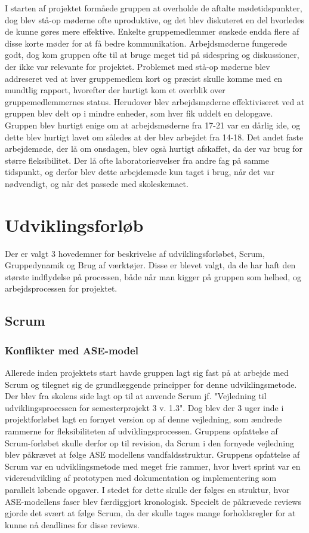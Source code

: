 I starten af projektet formåede gruppen at overholde de aftalte mødetidspunkter, dog blev stå-op møderne ofte uproduktive, og det blev diskuteret en del hvorledes de kunne gøres mere effektive. Enkelte gruppemedlemmer ønskede endda flere af disse korte møder for at få bedre kommunikation. Arbejdsmøderne fungerede godt, dog kom gruppen ofte til at bruge meget tid på sidespring og diskussioner, der ikke var relevante for projektet. Problemet med stå-op møderne blev addreseret ved at hver gruppemedlem kort og præcist skulle komme med en mundtlig rapport, hvorefter der hurtigt kom et overblik over gruppemedlemmernes status. Herudover blev arbejdsmøderne effektiviseret ved at gruppen blev delt op i mindre enheder, som hver fik uddelt en delopgave. Gruppen blev hurtigt enige om at arbejdsmøderne fra 17-21 var en dårlig ide, og dette blev hurtigt lavet om således at der blev arbejdet fra 14-18. Det andet faste arbejdemøde, der lå om onsdagen, blev også hurtigt afskaffet, da der var brug for større fleksibilitet. Der lå ofte laboratorieøvelser fra andre fag på samme tidspunkt, og derfor blev dette arbejdemøde kun taget i brug, når det var nødvendigt, og når det passede med skoleskemaet.    

\section{Udviklingsforløb}
Der er valgt 3 hovedemner for beskrivelse af udviklingsforløbet, Scrum, Gruppedynamik og Brug af værktøjer. Disse er blevet valgt, da de har haft den største indflydelse på processen, både når man kigger på gruppen som helhed, og arbejdsprocessen for projektet.  

\subsection{Scrum}
\subsubsection{Konflikter med ASE-model}
Allerede inden projektets start havde gruppen lagt sig fast på at arbejde med Scrum og tilegnet sig de grundlæggende principper for denne udviklingsmetode. Der blev fra skolens side lagt op til at anvende Scrum jf. "Vejledning til udviklingsprocessen for semesterprojekt 3 v. 1.3". Dog blev der 3 uger inde i projektforløbet lagt en fornyet version op af denne vejledning, som ændrede rammerne for fleksibiliteten af udviklingsprocessen. Gruppens opfattelse af Scrum-forløbet skulle derfor op til revision, da Scrum i den fornyede vejledning blev påkrævet at følge ASE modellens vandfaldsstruktur. Gruppens opfattelse af Scrum var en udviklingsmetode med meget frie rammer, hvor hvert sprint var en videreudvikling af prototypen med dokumentation og implementering som 
parallelt løbende opgaver. I stedet for dette skulle der følges en struktur, hvor ASE-modellens faser blev færdiggjort kronologisk. Specielt de påkrævede reviews gjorde det svært at følge Scrum, da der skulle tages mange forholdsregler for at kunne nå deadlines for disse reviews.
 
